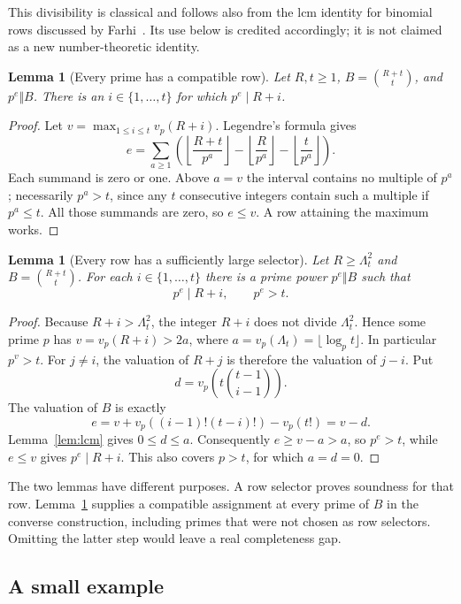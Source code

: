 \documentclass[11pt]{article}
\newtheorem{lemma}[theorem]{Lemma}
\theoremstyle{definition}
\begin{document}
This divisibility is classical and follows also from the lcm identity for
binomial rows discussed by Farhi~\cite{farhi}. Its use below is credited
accordingly; it is not claimed as a new number-theoretic identity.

\begin{lemma}[Every prime has a compatible row]\label{lem:all-primes}
Let $R,t\ge1$, $B=\binom{R+t}{t}$, and $p^e\Vert B$. There is an
$i\in\{1,\ldots,t\}$ for which $p^e\mid R+i$.
\end{lemma}
\begin{proof}
Let $v=\max_{1\le i\le t}v_p(R+i)$. Legendre's formula gives
\[
 e=\sum_{a\ge1}\left(
 \left\lfloor\frac{R+t}{p^a}\right\rfloor
 -\left\lfloor\frac{R}{p^a}\right\rfloor
 -\left\lfloor\frac{t}{p^a}\right\rfloor\right).
\]
Each summand is zero or one. Above $a=v$ the interval contains no
multiple of $p^a$; necessarily $p^a>t$, since any $t$ consecutive
integers contain such a multiple if $p^a\le t$. All those summands
are zero, so $e\le v$. A row attaining the maximum works.
\end{proof}

\begin{lemma}[Every row has a sufficiently large selector]\label{lem:each-row}
Let $R\ge\Lambda_t^2$ and $B=\binom{R+t}{t}$. For each
$i\in\{1,\ldots,t\}$ there is a prime power $p^e\Vert B$ such that
\[
                 p^e\mid R+i,\qquad p^e>t.
\]
\end{lemma}
\begin{proof}
Because $R+i>\Lambda_t^2$, the integer $R+i$ does not divide
$\Lambda_t^2$. Hence some prime $p$ has
$v=v_p(R+i)>2a$, where $a=v_p(\Lambda_t)=\lfloor\log_p t\rfloor$.
In particular $p^v>t$. For $j\ne i$, the valuation of $R+j$ is
therefore the valuation of $j-i$. Put
\[
 d=v_p\!\left(t\binom{t-1}{i-1}\right).
\]
The valuation of $B$ is exactly
\[
 e=v+v_p((i-1)!(t-i)!)-v_p(t!)=v-d.
\]
Lemma~\ref{lem:lcm} gives $0\le d\le a$. Consequently
$e\ge v-a>a$, so $p^e>t$, while $e\le v$ gives $p^e\mid R+i$.
This also covers $p>t$, for which $a=d=0$.
\end{proof}

The two lemmas have different purposes. A row selector proves soundness
for that row. Lemma~\ref{lem:all-primes} supplies a compatible assignment
at every prime of $B$ in the converse construction, including primes
that were not chosen as row selectors. Omitting the latter step would
leave a real completeness gap.

\subsection{A small example}
\end{document}
